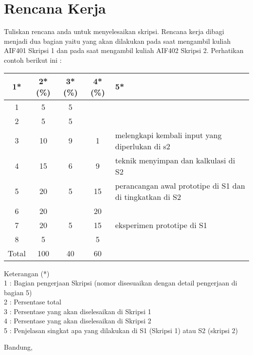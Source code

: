 \documentclass[a4paper,twoside]{article}
\begin{document}
\section{Rencana Kerja}
Tuliskan rencana anda untuk menyelesaikan skripsi. Rencana kerja dibagi menjadi dua bagian yaitu yang akan dilakukan pada saat mengambil kuliah AIF401 Skripsi 1 dan pada saat mengambil kuliah AIF402 Skripsi 2. Perhatikan contoh berikut ini :


\begin{center}
  \begin{tabular}{ | c | c | c | c | l |}
    \hline
    1*  & 2*(\%) & 3*(\%) & 4*(\%) &5*\\ \hline \hline
    1   & 5  & 5  &  &  \\ \hline
    2   & 5 & 5  &   & \\ \hline
    3   & 10  & 9  & 1 & {\footnotesize melengkapi kembali input yang diperlukan di s2}  \\ \hline
    4   & 15  & 6  &  9 & {\footnotesize teknik menyimpan dan kalkulasi di S2} \\ \hline
    5   & 20 & 5  & 15 & {\footnotesize perancangan awal prototipe di S1 dan di tingkatkan di S2} \\ \hline
    6   & 20 &   & 20  & \\ \hline
    7   & 20  & 5  & 15 &  {\footnotesize eksperimen prototipe di S1}\\ \hline
    8   & 5  &   &  5  & \\ \hline
    Total  & 100  & 40  & 60 &  \\ \hline
                          \end{tabular}
\end{center}

Keterangan (*)\\
1 : Bagian pengerjaan Skripsi (nomor disesuaikan dengan detail pengerjaan di bagian 5)\\
2 : Persentase total \\
3 : Persentase yang akan diselesaikan di Skripsi 1 \\
4 : Persentase yang akan diselesaikan di Skripsi 2 \\
5 : Penjelasan singkat apa yang dilakukan di S1 (Skripsi 1) atau S2 (skripsi 2)

\vspace{1cm}
\centering Bandung, \tanggal\\
\vspace{2cm} \nama \\ 
\vspace{1cm}
\end{document}
